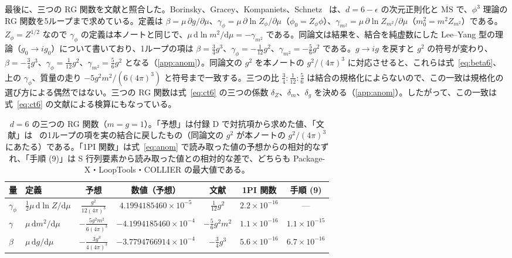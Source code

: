 \documentclass[a4paper,10pt]{ltjsarticle}
\newcommand{\dd}{\mathrm{d}}
\begin{document}
最後に、三つの RG 関数を文献と照合した。Borinsky、Gracey、Kompaniets、Schnetz~\cite{bgks} は、$d=6-\epsilon$ の次元正則化と $\overline{\mathrm{MS}}$ で、$\phi^3$ 理論の RG 関数を5ループまで求めている。定義は $\beta=\mu\,\partial g/\partial\mu$、$\gamma_\phi=\mu\,\partial\ln Z_\phi/\partial\mu$（$\phi_0=Z_\phi\phi$）、$\gamma_{m^2}=\mu\,\partial\ln Z_{m^2}/\partial\mu$（$m_0^2=m^2Z_{m^2}$）である。$Z_\phi=Z^{1/2}$ なので $\gamma_\phi$ の定義は本ノートと同じで、$\mu\,\dd\ln m^2/\dd\mu=-\gamma_{m^2}$ である。同論文は結果を、結合を純虚数にした Lee--Yang 型の理論（$g_0\to ig_0$）について書いており、1ループの項は $\beta=\frac34g^3$、$\gamma_\phi=-\frac1{12}g^2$、$\gamma_{m^2}=-\frac56g^2$ である。$g\to ig$ を戻すと $g^2$ の符号が変わり、$\beta=-\frac34g^3$、$\gamma_\phi=\frac1{12}g^2$、$\gamma_{m^2}=\frac56g^2$ となる（\ref{app:anom}）。同論文の $g^2$ を本ノートの $g^2/(4\pi)^3$ に対応させると、これらは式~\eqref{eq:beta6}、上の $\gamma_\phi$、質量の走り $-5g^2m^2/(6(4\pi)^3)$ と符号まで一致する。三つの比 $\frac34:\frac1{12}:\frac56$ は結合の規格化によらないので、この一致は規格化の選び方による偶然ではない。三つの RG 関数は式~\eqref{eq:ct6} の三つの係数 $\delta_Z$、$\delta_m$、$\delta_g$ を決める（\ref{app:anom}）。したがって、この一致は式~\eqref{eq:ct6} の文献による検算にもなっている。

\begin{table}[tbp]
\centering\small
\caption{$d=6$ の三つの RG 関数（$m=g=1$）。「予想」は付録 D で対抗項から求めた値、「文献」は~\cite{bgks} の1ループの項を実の結合に戻したもの（同論文の $g^2$ が本ノートの $g^2/(4\pi)^3$ にあたる）である。「1PI 関数」は式~\eqref{eq:anom} で読み取った値の予想からの相対的なずれ、「手順 (9)」は S 行列要素から読み取った値との相対的な差で、どちらも Package-X・LoopTools・COLLIER の最大値である。}
\label{tab:anom6}
\begin{tabular}{llccccc}
\toprule
量 & 定義 & 予想 & 数値（予想） & 文献 & 1PI 関数 & 手順 (9) \\
\midrule
$\gamma_\phi$ & $\frac12\mu\,\dd\ln Z/\dd\mu$ & $\frac{g^2}{12(4\pi)^3}$ & $4.1994185460\times10^{-5}$ & $\frac1{12}g^2$ & $2.2\times10^{-16}$ & — \\[2pt]
$\gamma$ & $\mu\,\dd m^2/\dd\mu$ & $-\frac{5g^2m^2}{6(4\pi)^3}$ & $-4.1994185460\times10^{-4}$ & $-\frac56g^2m^2$ & $1.1\times10^{-16}$ & $1.1\times10^{-15}$ \\[2pt]
$\beta$ & $\mu\,\dd g/\dd\mu$ & $-\frac{3g^3}{4(4\pi)^3}$ & $-3.7794766914\times10^{-4}$ & $-\frac34g^3$ & $5.6\times10^{-16}$ & $6.7\times10^{-16}$ \\
\bottomrule
\end{tabular}
\end{table}
\end{document}
